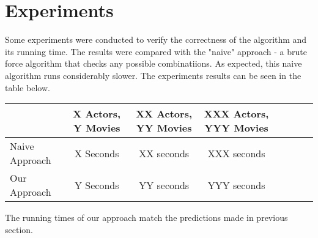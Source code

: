 \label{Experiments}
\section{Experiments}


Some experiments were conducted to verify the correctness of the algorithm and its running time. The results were compared with the "naive" approach - a brute force algorithm that checks any possible combinatiions. As expected, this naive algorithm runs considerably slower. The experiments results can be seen in the table below.

\begin{tabular}{l*{6}{c}r}
               & X Actors, Y Movies & XX Actors, YY Movies & XXX Actors, YYY Movies \\
\hline
Naive Approach & X Seconds & XX seconds & XXX seconds\\
Our Approach   & Y Seconds & YY seconds & YYY seconds\\
\end{tabular}
The running times of our approach match the predictions made in previous section.